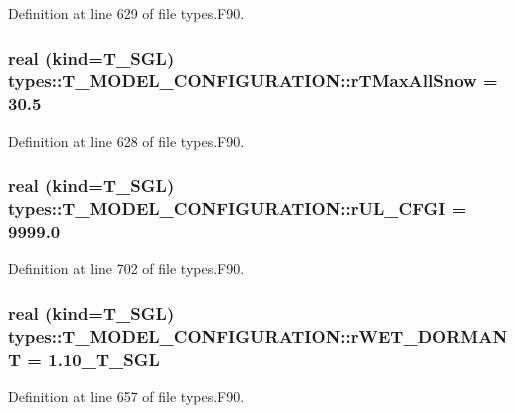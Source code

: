 Definition at line 629 of file types.F90.

\hypertarget{typetypes_1_1_t___m_o_d_e_l___c_o_n_f_i_g_u_r_a_t_i_o_n_a849eb6df6879c3e23519f49f9d65322c}{
\subsubsection[{rTMaxAllSnow}]{\setlength{\rightskip}{0pt plus 5cm}real (kind={\bf T\_\-SGL}) {\bf types::T\_\-MODEL\_\-CONFIGURATION::rTMaxAllSnow} = 30.5}}
\label{typetypes_1_1_t___m_o_d_e_l___c_o_n_f_i_g_u_r_a_t_i_o_n_a849eb6df6879c3e23519f49f9d65322c}


Definition at line 628 of file types.F90.

\hypertarget{typetypes_1_1_t___m_o_d_e_l___c_o_n_f_i_g_u_r_a_t_i_o_n_a071252bacb3e362f45b538f75ab1cf82}{
\subsubsection[{rUL\_\-CFGI}]{\setlength{\rightskip}{0pt plus 5cm}real (kind={\bf T\_\-SGL}) {\bf types::T\_\-MODEL\_\-CONFIGURATION::rUL\_\-CFGI} = 9999.0}}
\label{typetypes_1_1_t___m_o_d_e_l___c_o_n_f_i_g_u_r_a_t_i_o_n_a071252bacb3e362f45b538f75ab1cf82}


Definition at line 702 of file types.F90.

\hypertarget{typetypes_1_1_t___m_o_d_e_l___c_o_n_f_i_g_u_r_a_t_i_o_n_abc74ede52f5982a8acfcacb9c636be63}{
\subsubsection[{rWET\_\-DORMANT}]{\setlength{\rightskip}{0pt plus 5cm}real (kind={\bf T\_\-SGL}) {\bf types::T\_\-MODEL\_\-CONFIGURATION::rWET\_\-DORMANT} = 1.10\_\-T\_\-SGL}}
\label{typetypes_1_1_t___m_o_d_e_l___c_o_n_f_i_g_u_r_a_t_i_o_n_abc74ede52f5982a8acfcacb9c636be63}


Definition at line 657 of file types.F90.

